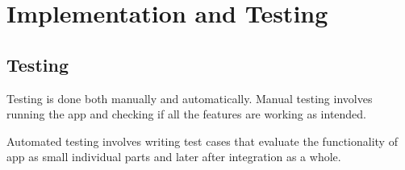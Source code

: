 \documentclass[../Report.tex]{subfiles}
\begin{document}
\chapter{Implementation and Testing}







\section{Testing}

Testing is done both manually and automatically. Manual testing involves running the app and checking if all the features are working as 
intended.\par
Automated testing involves writing test cases that evaluate the functionality of app as small individual parts and later after integration 
as a whole.


\end{document}
